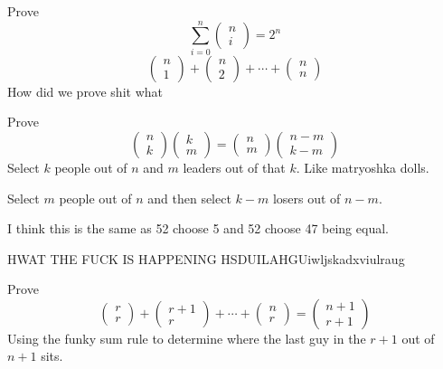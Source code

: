 \documentclass{report}
\begin{document}
Prove
\[
\sum^n_{i=0}\begin{pmatrix}n\\ i \end{pmatrix} = 2^n
\]
\[
\begin{pmatrix} n \\ 1 \end{pmatrix}
+
\begin{pmatrix} n \\ 2 \end{pmatrix}
+
\cdots
+
\begin{pmatrix} n \\ n \end{pmatrix}
\]
How did we prove shit what

\newpage
Prove
\[
\begin{pmatrix} n \\ k \end{pmatrix}
\begin{pmatrix} k \\ m \end{pmatrix}
=
\begin{pmatrix} n \\ m \end{pmatrix}
\begin{pmatrix} n-m \\ k-m \end{pmatrix}
\]
Select $k$ people out of $n$ and $m$ leaders out of that $k$. Like matryoshka dolls.

Select $m$ people out of $n$ and then select $k-m$ losers out of $n-m$.

I think this is the same as 52 choose 5 and 52 choose 47 being equal.

HWAT THE FUCK IS HAPPENING HSDUILAHGUiwljskadxviulraug

Prove
\[
\begin{pmatrix} r \\ r \end{pmatrix}
+
\begin{pmatrix} r+1 \\ r \end{pmatrix}
+
\cdots
+
\begin{pmatrix} n \\ r \end{pmatrix}
=
\begin{pmatrix} n+1 \\ r+1 \end{pmatrix}
\]
Using the funky sum rule to determine where the last guy in the $r+1$ out of $n+1$ sits.
\end{document}
